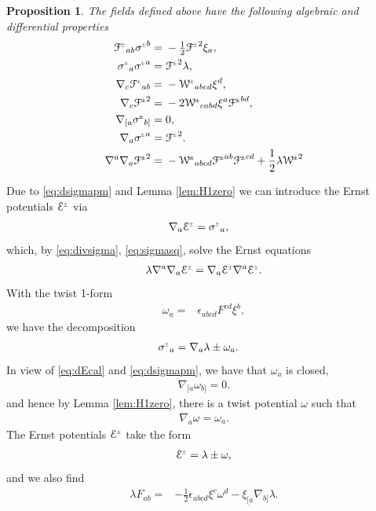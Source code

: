 \documentclass[a4paper,10pt,reqno]{amsart}
\newcommand{\cE}{\mathcal{E}}
\theoremstyle{plain}
\newtheorem{prop}[thm]{Proposition}
\newcommand{\PM}[1]{{{#1}^{\hspace{-.5pt}\scaleto{\pm}{3.5pt}}}}
\def\Wcal{\mathcal{W}}
\def\Fcal{\mathcal{F}}
\def\Ecal{\mathcal{E}}
\numberwithin{equation}{section}
\begin{document}
\begin{prop} \label{prop:xi-id} 
The fields defined above have the following algebraic and differential properties
\begin{subequations} \label{eq:xi-id}
\begin{align}
\PM{\Fcal}_{ab} \PM{\sigma}^{b}={}&- \tfrac{1}{2} \PM{\Fcal}^2\xi_{a}, \label{eq:Fsigma} \\
\PM{\sigma}_{a} \PM{\sigma}^{a}={}& \PM{\Fcal}^2 \lambda, \label{eq:sigmasq}\\
\nabla_{c}\PM{\Fcal}_{ab}={}&- \PM{\Wcal}_{abcd} \xi^{d}, \label{eq:nablaFcal} \\
\nabla_{c}\PM{\Fcal}^2={}&-2  \PM{\Wcal}_{cabd} \xi^{a}\PM{\Fcal}^{bd}, \label{eq:nablaFsq}\\
\nabla_{[a}\PM{\sigma}_{b]} ={}& 0, \label{eq:dsigmapm} \\
\nabla_{a}\PM{\sigma}^{a}={}&\PM{\Fcal}^2. \label{eq:divsigma} \\
\nabla^a \nabla_a \PM{\Fcal}^2 ={}& 
- \PM{\Wcal}_{abcd} \PM{\Fcal}^{ab} \PM{\Fcal}^{cd}
+ \frac{1}{2} \lambda  \PM{\Wcal}^2\label{eq:laplaceFsq}
\end{align}
\end{subequations}
\end{prop}

Due to \eqref{eq:dsigmapm} and Lemma \ref{lem:H1zero} we can introduce the Ernst potentials $\PM{\Ecal}$ via
\begin{align} \label{eq:Epm}
\nabla_{a}\PM{\Ecal}={}&\PM{\sigma}_{a},
\end{align}
which, by \eqref{eq:divsigma}, \eqref{eq:sigmasq}, solve the Ernst equations
\begin{align}\label{eq:DeltaEcal}
\lambda \nabla^a \nabla_a \PM{\Ecal} = \nabla_a \PM{\Ecal} \nabla^a \PM{\Ecal}.
\end{align}
With the twist 1-form
\begin{align}
\omega_{a}={}&\epsilon_{abcd} F^{cd} \xi^{b},
\end{align}
we have the decomposition
\begin{align} \label{eq:dEcal}
\PM{\sigma}_{a}={}& \nabla_{a}\lambda \pm \omega_{a}.
\end{align}
In view of \eqref{eq:dEcal}  and \eqref{eq:dsigmapm}, we have that $\omega_{a}$ is closed, 
\begin{align} 
\nabla_{[a} \omega_{b]} = 0. 
\end{align} 
and hence by Lemma \ref{lem:H1zero}, there is a  twist potential $\omega$  such that 
\begin{align} 
\nabla_a \omega = \omega_a. 
\end{align} 
The Ernst potentials $\PM{\cE}$ take the form
\begin{align} \label{eq:Ecal-lam-om} 
\PM{\Ecal} = \lambda \pm \omega,
\end{align}
and we also find  
\begin{align}
\lambda F_{ab} ={}&- \tfrac{1}{2} \epsilon_{abcd} \xi^{c} \omega^{d}
-\xi_{[a}\nabla_{b]}\lambda .
\end{align}
\end{document}
